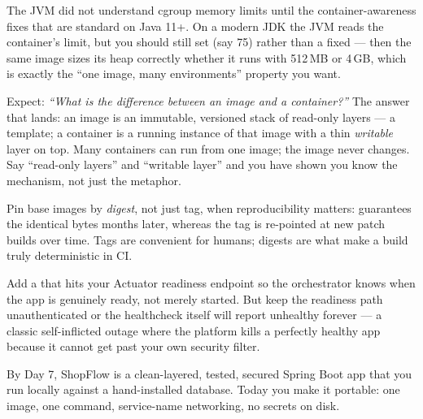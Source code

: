 \begin{seniornote}
The JVM did not understand cgroup memory limits until the container-awareness fixes that are standard on Java 11+. On a modern JDK the JVM reads the container's limit, but you should still set  (say 75) rather than a fixed  --- then the same image sizes its heap correctly whether it runs with 512\,MB or 4\,GB, which is exactly the ``one image, many environments'' property you want.
\end{seniornote}

\begin{interview}
Expect: \emph{``What is the difference between an image and a container?''} The answer that lands: an image is an immutable, versioned stack of read-only layers --- a template; a container is a running instance of that image with a thin \emph{writable} layer on top. Many containers can run from one image; the image never changes. Say ``read-only layers'' and ``writable layer'' and you have shown you know the mechanism, not just the metaphor.
\end{interview}

\begin{perfnote}
Pin base images by \emph{digest}, not just tag, when reproducibility matters:  guarantees the identical bytes months later, whereas the  tag is re-pointed at new patch builds over time. Tags are convenient for humans; digests are what make a build truly deterministic in CI.
\end{perfnote}

\begin{prodtip}
Add a  that hits your Actuator readiness endpoint so the orchestrator knows when the app is genuinely ready, not merely started. But keep the readiness path unauthenticated or the healthcheck itself will report unhealthy forever --- a classic self-inflicted outage where the platform kills a perfectly healthy app because it cannot get past your own security filter.
\end{prodtip}


By Day 7, ShopFlow is a clean-layered, tested, secured Spring Boot app that you run locally against a hand-installed database. Today you make it portable: one image, one command, service-name networking, no secrets on disk.


